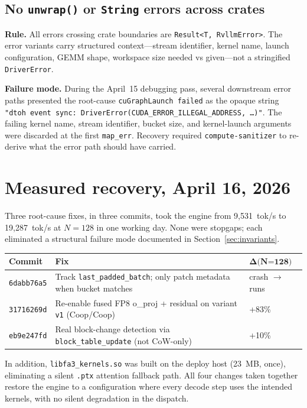 \subsection{No \texttt{unwrap()} or \texttt{String} errors across crates}

\textbf{Rule.} All errors crossing crate boundaries are
\texttt{Result<T, RvllmError>}. The error variants carry structured
context---stream identifier, kernel name, launch configuration, GEMM
shape, workspace size needed vs given---not a stringified
\texttt{DriverError}.

\textbf{Failure mode.} During the April~15 debugging pass, several
downstream error paths presented the root-cause \texttt{cuGraphLaunch
failed} as the opaque string
\texttt{"dtoh event sync: DriverError(CUDA\_ERROR\_ILLEGAL\_ADDRESS, \dots)"}.
The failing kernel name, stream identifier, bucket size, and
kernel-launch arguments were discarded at the first \texttt{map\_err}.
Recovery required \texttt{compute-sanitizer} to re-derive what the
error path should have carried.

\section{Measured recovery, April 16, 2026}
\label{sec:recovery}

Three root-cause fixes, in three commits, took the engine from
9{,}531~tok/s to 19{,}287~tok/s at $N\!=\!128$ in one working day. None
were stopgaps; each eliminated a structural failure mode documented in
Section~\ref{sec:invariants}.

\begin{tabular}{lll}
\toprule
\textbf{Commit} & \textbf{Fix} & $\boldsymbol{\Delta\text{(N=128)}}$ \\
\midrule
\texttt{6dabb76a5}
  & Track \texttt{last\_padded\_batch}; only patch metadata when bucket matches
  & crash $\to$ runs \\
\texttt{31716269d}
  & Re-enable fused FP8 o\_proj + residual on variant \texttt{v1} (Coop/Coop)
  & +83\% \\
\texttt{eb9e247fd}
  & Real block-change detection via \texttt{block\_table\_update} (not CoW-only)
  & +10\% \\
\bottomrule
\end{tabular}

In addition, \texttt{libfa3\_kernels.so} was built on the deploy host
(23~MB, once), eliminating a silent \texttt{.ptx} attention fallback path.
All four changes taken together restore the engine to a configuration
where every decode step uses the intended kernels, with no silent
degradation in the dispatch.

